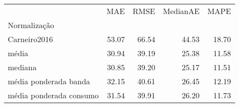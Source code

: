 \begin{tabular}{lrrrr}
\toprule
 & MAE & RMSE & MedianAE & MAPE \\
Normalização &  &  &  &  \\
\midrule
Carneiro2016 & 53.07 & 66.54 & 44.53 & 18.70 \\
média & 30.94 & 39.19 & 25.38 & 11.58 \\
mediana & 30.85 & 39.20 & 25.17 & 11.51 \\
média ponderada banda & 32.15 & 40.61 & 26.45 & 12.19 \\
média ponderada consumo & 31.54 & 39.91 & 26.20 & 11.73 \\
\bottomrule
\end{tabular}
